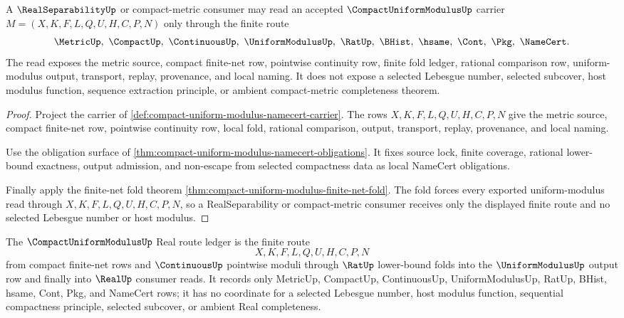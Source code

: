 \begin{theorem}
\label{thm:compact-uniform-modulus-real-separability-handoff}
A $\RealSeparabilityUp$ or compact-metric consumer may read an accepted $\CompactUniformModulusUp$ carrier $M=(X,K,F,L,Q,U,H,C,P,N)$ only through the finite route
$$
\MetricUp,\ \CompactUp,\ \ContinuousUp,\ \UniformModulusUp,\ \RatUp,\ \BHist,\ \hsame,\ \Cont,\ \Pkg,\ \NameCert .
$$
The read exposes the metric source, compact finite-net row, pointwise continuity row, finite fold ledger, rational comparison row, uniform-modulus output, transport, replay, provenance, and local naming. It does not expose a selected Lebesgue number, selected subcover, host modulus function, sequence extraction principle, or ambient compact-metric completeness theorem.
\end{theorem}
\begin{proof}
Project the carrier of \autoref{def:compact-uniform-modulus-namecert-carrier}. The rows $X,K,F,L,Q,U,H,C,P,N$ give the metric source, compact finite-net row, pointwise continuity row, local fold, rational comparison, output, transport, replay, provenance, and local naming.

Use the obligation surface of \autoref{thm:compact-uniform-modulus-namecert-obligations}. It fixes source lock, finite coverage, rational lower-bound exactness, output admission, and non-escape from selected compactness data as local NameCert obligations.

Finally apply the finite-net fold theorem \autoref{thm:compact-uniform-modulus-finite-net-fold}. The fold forces every exported uniform-modulus read through $X,K,F,L,Q,U,H,C,P,N$, so a RealSeparability or compact-metric consumer receives only the displayed finite route and no selected Lebesgue number or host modulus.
\end{proof}

\begin{definition}
\label{def:compact-uniform-modulus-real-route-ledger}
The $\CompactUniformModulusUp$ Real route ledger is the finite route
$$
X,K,F,L,Q,U,H,C,P,N
$$
from compact finite-net rows and $\ContinuousUp$ pointwise moduli through $\RatUp$ lower-bound folds into the $\UniformModulusUp$ output row and finally into $\RealUp$ consumer reads. It records only MetricUp, CompactUp, ContinuousUp, UniformModulusUp, RatUp, BHist, hsame, Cont, Pkg, and NameCert rows; it has no coordinate for a selected Lebesgue number, host modulus function, sequential compactness principle, selected subcover, or ambient Real completeness.
\end{definition}

